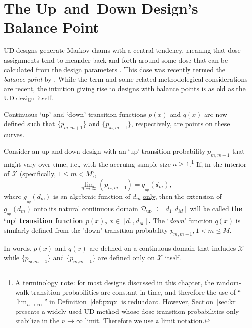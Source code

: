 
\section{The Up--and--Down Design's Balance Point}\label{sec:balpoint}

UD designs generate Markov chains with a central tendency, meaning that dose assignments tend to meander back and forth around some dose that can be calculated from the design parameters \citep{Durh:Flou:rand:1994,Hugh:Rand:1995}. This dose was recently termed the \emph{balance point} by \cite{Oron:Hoff:thek:2009}. While the term and some related methodological considerations are recent, the intuition giving rise to designs with balance points is as old as the UD design itself.

Continuous `up' and `down' transition functions $p(x)$ and $q(x)$ are now defined such that
$\{p_{m;m+1}\}$ and $\{p_{m;m-1}\}$, respectively, are points on these curves.
%
\begin{defn}\label{def:pxqx}
Consider an up-and-down design with an `up' transition probability  $p_{m,m+1}$ that might vary over time, i.e., with the accruing sample size $n\geq 1$.\footnote{A terminology note: for most designs discussed in this chapter, the random-walk transition probabilities are constant in time, and therefore the use of ``$\lim_{n\to\infty}$'' in Definition~\ref{def:pxqx} is redundant. However, Section~\ref{sec:kr} presents a widely-used UD method whose dose-transition probabilities only stabilize in the $n\to\infty$ limit. Therefore we use a limit notation.} If, in the interior of $\mathcal{X}$ $($specifically, $1\leq m<M)$, $$\lim_{n\to\infty}\left(p_{m,m+1}\right)=g_{_\mathrm{up}}\left(d_m\right),$$
where $g_{_\mathrm{up}}\left(d_m\right)$ is an algebraic function of $d_m$  \underline{only}, then the extension of $g_{_\mathrm{up}}\left(d_m\right)$ onto its natural continuous domain $\mathcal{D}{_\mathrm{up}}\supseteq\left[d_1,d_M\right]$ will be called \textbf{the `up' transition function $p(x)$, $x\in\left[d_1,d_M\right]$.} The `\emph{down}' function $q(x)$ is similarly defined from the `down' transition probability $p_{m,m-1}, 1<m\leq M$.
\end{defn}
%
\noindent In words, $p(x)$ and $q(x)$ are defined on a continuous domain that includes $\mathcal{X}$ while $\{p_{m,m+1}\}$ and $\{p_{m,m-1}\}$ are defined only on $\mathcal{X}$ itself.

